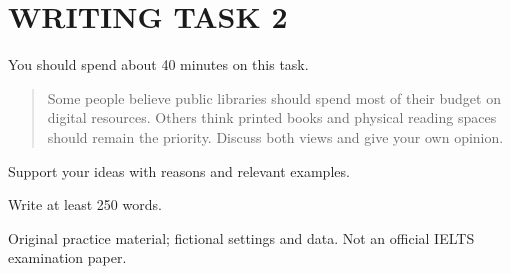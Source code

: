 \section*{WRITING TASK 2}
You should spend about 40 minutes on this task.

\begin{quote}\large Some people believe public libraries should spend most of their budget on digital resources. Others think printed books and physical reading spaces should remain the priority. Discuss both views and give your own opinion.
\end{quote}
Support your ideas with reasons and relevant examples.

Write at least 250 words.
\par\bigskip
{\footnotesize\color{gray} Original practice material; fictional settings and data. Not an official IELTS examination paper.}
